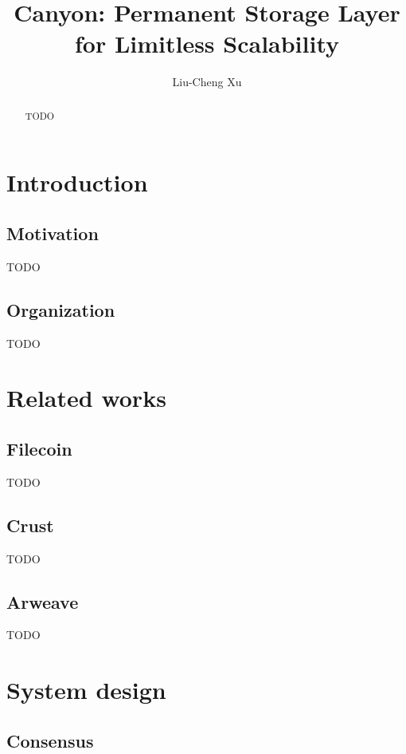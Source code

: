 \documentclass[]{article}
\title{Canyon: Permanent Storage Layer for Limitless Scalability}
\author{Liu-Cheng Xu}
\date{}
\begin{document}
\maketitle

\begin{abstract}

    TODO

\end{abstract}

\tableofcontents

\newpage

\section{Introduction}

\subsection{Motivation}

TODO

\subsection{Organization}

TODO

\section{Related works}

\subsection{Filecoin}

TODO

\subsection{Crust}

TODO

\subsection{Arweave}

TODO

\section{System design}

\subsection{Consensus}
\end{document}
